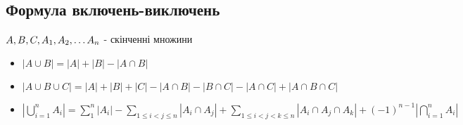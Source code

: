 \documentclass{article}
\begin{document}
\subsection*{Формула включень-виключень}
$A, B, C, A_1, A_2, \mathellipsis A_n$ - скінченні множини
\begin{itemize}
    \item $|A \cup B| = |A| + |B| - |A \cap B|$
    \item $|A \cup B \cup C| = |A| + |B| + |C| - |A \cap B| - |B \cap C| - |A \cap C| + |A \cap B \cap C|$
    \item $|\bigcup_{i=1}^{n}A_i| = \sum_{1}^{n}|A_i| - \sum_{1 \leq i < j \leq n}|A_i \cap A_j| +
    \sum_{1 \leq i < j < k \leq n}|A_i \cap A_j \cap A_k| + (-1)^{n-1}|\bigcap_{i=1}^n A_i|$
\end{itemize}
\end{document}
